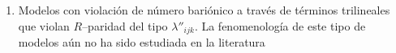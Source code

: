 \begin{ideas}
\begin{enumerate}
\label{item:3}
\item Modelos con violación de número bariónico a través de términos trilineales que violan $R$--paridad del tipo $\lambda''_{ijk}$. La fenomenología de este tipo de modelos aún no ha sido estudiada en la literatura
\label{item:4}
\end{enumerate}



\end{ideas}
